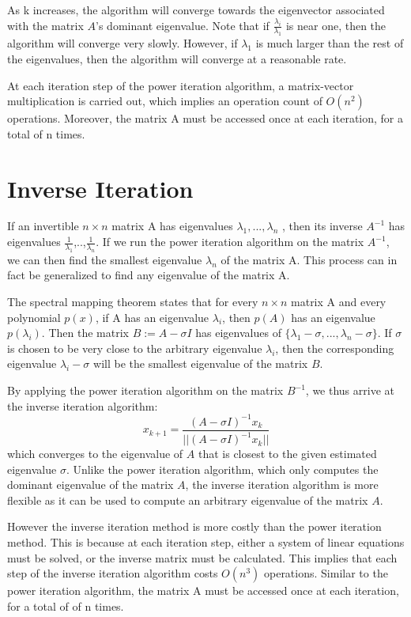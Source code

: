 \documentclass[11pt]{amsart}
\begin{document}
As k increases, the algorithm will converge towards the eigenvector associated with the matrix $A$'s dominant eigenvalue. Note that if $\frac{\lambda_i}{\lambda_1}$ is near one, then the algorithm will converge very slowly. However, if $\lambda_1$ is much larger than the rest of the eigenvalues, then the algorithm will converge at a reasonable rate. 

At each iteration step of the power iteration algorithm,  a matrix-vector multiplication is carried out, which implies an operation count of $O(n^2)$ operations. Moreover, the matrix A must be accessed once at each iteration, for a total of n times.

\section*{Inverse Iteration}
If an invertible $n\times n$ matrix A has eigenvalues $\lambda_1,...,\lambda_n$ , then its inverse $A^{-1}$ has eigenvalues $\frac{1}{\lambda_1}$,..,$\frac{1}{\lambda_n}$. If we run the power iteration algorithm on the matrix $A^{-1}$, we can then find the smallest eigenvalue $\lambda_n$ of the matrix A. This process can in fact be generalized to find any eigenvalue of the matrix A.

The spectral mapping theorem states that for every $n\times n$ matrix A and every polynomial $p(x)$, if A has an eigenvalue $\lambda_i$, then $p(A)$ has an eigenvalue $p(\lambda_i)$. Then the matrix $B := A - \sigma I$ has eigenvalues of $\{\lambda_1 - \sigma,...,\lambda_n - \sigma\}$. If $\sigma$ is chosen to be very close to the arbitrary eigenvalue $\lambda_i$, then the corresponding eigenvalue $\lambda_i - \sigma$ will be the smallest eigenvalue of the matrix $B$.

By applying the power iteration algorithm on the matrix $B^{-1}$, we thus arrive at the inverse iteration algorithm: 
\[
	x_{k+1} = \frac{(A-\sigma I)^{-1}x_k}{||(A-\sigma I)^{-1}x_k||}
\]
which converges to the eigenvalue of $A$ that is closest to the given estimated eigenvalue $\sigma$. Unlike the power iteration algorithm, which only computes the dominant eigenvalue of the matrix $A$, the inverse iteration algorithm is more flexible as it can be used to compute an arbitrary eigenvalue of the matrix $A$.

However the inverse iteration method is more costly than the power iteration method. This is because at each iteration step, either a system of linear equations must be solved, or the inverse matrix must be calculated. This implies that each step of the inverse iteration algorithm costs $O(n^3)$ operations. Similar to the power iteration algorithm, the matrix A must be accessed once at each iteration, for a total of of n times. 
\end{document}
